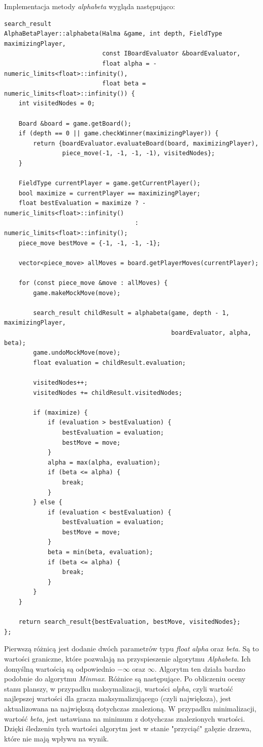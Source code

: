 \documentclass[a4paper, 12pt]{article}
\begin{document}
Implementacja metody \textit{alphabeta} wygląda następująco:
\begin{lstlisting}
search_result
AlphaBetaPlayer::alphabeta(Halma &game, int depth, FieldType maximizingPlayer,
                           const IBoardEvaluator &boardEvaluator,
                           float alpha = -numeric_limits<float>::infinity(),
                           float beta = numeric_limits<float>::infinity()) {
    int visitedNodes = 0;

    Board &board = game.getBoard();
    if (depth == 0 || game.checkWinner(maximizingPlayer)) {
        return {boardEvaluator.evaluateBoard(board, maximizingPlayer),
                piece_move(-1, -1, -1, -1), visitedNodes};
    }

    FieldType currentPlayer = game.getCurrentPlayer();
    bool maximize = currentPlayer == maximizingPlayer;
    float bestEvaluation = maximize ? -numeric_limits<float>::infinity()
                                    : numeric_limits<float>::infinity();
    piece_move bestMove = {-1, -1, -1, -1};

    vector<piece_move> allMoves = board.getPlayerMoves(currentPlayer);

    for (const piece_move &move : allMoves) {
        game.makeMockMove(move);

        search_result childResult = alphabeta(game, depth - 1, maximizingPlayer,
                                              boardEvaluator, alpha, beta);
        game.undoMockMove(move);
        float evaluation = childResult.evaluation;

        visitedNodes++;
        visitedNodes += childResult.visitedNodes;

        if (maximize) {
            if (evaluation > bestEvaluation) {
                bestEvaluation = evaluation;
                bestMove = move;
            }
            alpha = max(alpha, evaluation);
            if (beta <= alpha) {
                break;
            }
        } else {
            if (evaluation < bestEvaluation) {
                bestEvaluation = evaluation;
                bestMove = move;
            }
            beta = min(beta, evaluation);
            if (beta <= alpha) {
                break;
            }
        }
    }

    return search_result{bestEvaluation, bestMove, visitedNodes};
};
\end{lstlisting}
Pierwszą różnicą jest dodanie dwóch parametrów typu \textit{float} \textit{alpha} oraz \textit{beta}.
Są to wartości graniczne, które pozwalają na przyspieszenie algorytmu \textit{Alphabeta}.
Ich domyślną wartością są odpowiednio $-\infty$ oraz $\infty$. 
Algorytm ten działa bardzo podobnie do algorytmu \textit{Minmax}. Różnice są następujące.
Po obliczeniu oceny stanu planszy, w przypadku maksymalizacji, wartości \textit{alpha}, czyli 
wartość najlepszej wartości dla gracza maksymalizującego (czyli największa), jest aktualizowana na największą dotychczas znalezioną.
W przypadku minimalizacji, wartość \textit{beta}, jest ustawiana na minimum z dotychczas znalezionych wartości.
Dzięki śledzeniu tych wartości algorytm jest w stanie "przyciąć" gałęzie drzewa, które nie mają wpływu na wynik. 
\end{document}
